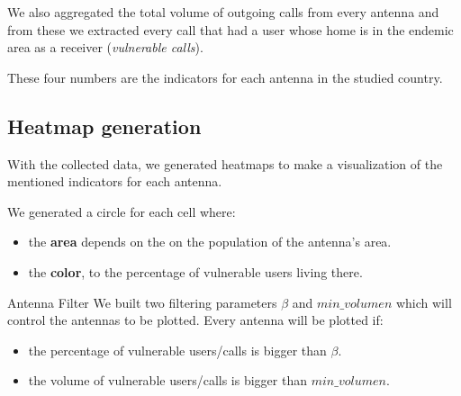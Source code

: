     We also aggregated the total volume of outgoing calls from every antenna and from these we extracted every call that had a user whose home is in the endemic area as a receiver (\textit{vulnerable calls}).
    
    These four numbers are the indicators for each antenna in the studied country.

\subsection{Heatmap generation}
    With the collected data, we generated heatmaps to make a visualization of the mentioned indicators for each antenna.
    
	We generated a circle for each cell where:
	\begin{itemize}
		\item the \textbf{area} depends on the on the population of the antenna's area.
		\item the \textbf{color}, to the percentage of vulnerable users living there.
	\end{itemize}


	
		\begin{block}{Antenna Filter}
		We built two filtering parameters $\beta$ and $min\_volumen$ which will control the antennas to be plotted.
		Every antenna will be plotted if:
		\begin{itemize}
			\item the percentage of vulnerable users/calls is bigger than  $\beta$.
			\item the volume of vulnerable users/calls is bigger than $min\_volumen$. 
		\end{itemize}
		
		
		
	\end{block}